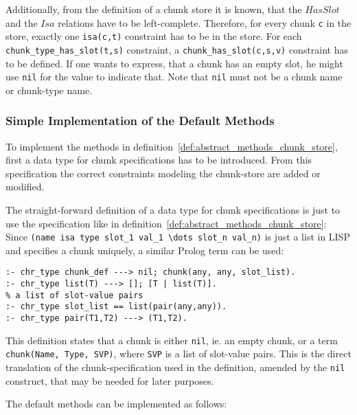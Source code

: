 Additionally, from the definition of a chunk store it is known, that the $HasSlot$ and the $Isa$ relations have to be left-complete.  Therefore, for every chunk \verb|c| in the store, exactly one \verb|isa(c,t)| constraint has to be in the store. For each \verb|chunk_type_has_slot(t,s)| constraint, a \verb|chunk_has_slot(c,s,v)| constraint has to be defined. If one wants to express, that a chunk has an empty slot, he might use \verb|nil| for the value to indicate that. Note that \verb|nil| must not be a chunk name or chunk-type name.

\subsubsection{Simple Implementation of the Default Methods}
\label{chunk_specification}

To implement the methods in definition~\ref{def:abstract_methods_chunk_store}, first a data type for chunk specifications has to be introduced. From this specification the correct constraints modeling the chunk-store are added or modified.

The straight-forward definition of a data type for chunk specifications is just to use the specification like in definition~\ref{def:abstract_methods_chunk_store}: Since \verb|(name isa type slot_1 val_1 \dots slot_n val_n)| is just a list in LISP and specifies a chunk uniquely, a similar Prolog term can be used:

\begin{lstlisting}
:- chr_type chunk_def ---> nil; chunk(any, any, slot_list).
:- chr_type list(T) ---> []; [T | list(T)].
% a list of slot-value pairs
:- chr_type slot_list == list(pair(any,any)).
:- chr_type pair(T1,T2) ---> (T1,T2).
\end{lstlisting}

This definition states that a chunk is either \verb|nil|, ie. an empty chunk, or a term \verb|chunk(Name, Type, SVP)|, where \verb|SVP| is a list of slot-value pairs. This is the direct translation of the chunk-specification used in the definition, amended by the \verb|nil| construct, that may be needed for later purposes.

The default methods can be implemented as follows:

\begin{lstlisting}[caption={rules for \texttt{add\_chunk}}]
 
\end{lstlisting}

